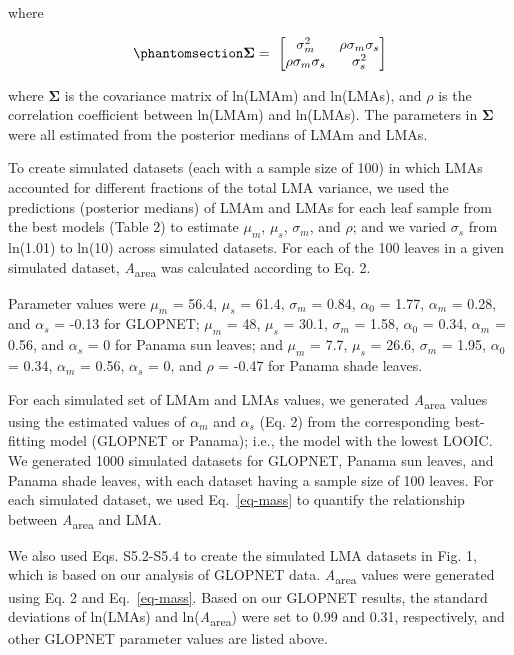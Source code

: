 \documentclass[
  12pt,
  letterpaper,
  DIV=11,
  numbers=noendperiod]{scrartcl}
\numberwithin{equation}{section}
\begin{document}
where

\begin{equation}\phantomsection\label{eq-Sigma}{
\boldsymbol{\Sigma} = \
\begin{bmatrix}
\sigma_m^2 & \rho \sigma_m \sigma_s \\
\rho \sigma_m \sigma_s & \sigma_s^2 \\
\end{bmatrix}
}\end{equation}

where \(\boldsymbol{\Sigma}\) is the covariance matrix of ln(LMAm) and
ln(LMAs), and \(\rho\) is the correlation coefficient between ln(LMAm)
and ln(LMAs). The parameters in \(\boldsymbol{\Sigma}\) were all
estimated from the posterior medians of LMAm and LMAs.

To create simulated datasets (each with a sample size of 100) in which
LMAs accounted for different fractions of the total LMA variance, we
used the predictions (posterior medians) of LMAm and LMAs for each leaf
sample from the best models (Table 2) to estimate \(\mu_m\), \(\mu_s\),
\(\sigma_m\), and \(\rho\); and we varied \(\sigma_s\) from ln(1.01) to
ln(10) across simulated datasets. For each of the 100 leaves in a given
simulated dataset, \emph{A}\textsubscript{area} was calculated according
to Eq. 2.

Parameter values were \(\mu_m\) = 56.4, \(\mu_s\) = 61.4, \(\sigma_m\) =
0.84, \(\alpha_0\) = 1.77, \(\alpha_m\) = 0.28, and \(\alpha_s\) = -0.13
for GLOPNET; \(\mu_m\) = 48, \(\mu_s\) = 30.1, \(\sigma_m\) = 1.58,
\(\alpha_0\) = 0.34, \(\alpha_m\) = 0.56, and \(\alpha_s\) = 0 for
Panama sun leaves; and \(\mu_m\) = 7.7, \(\mu_s\) = 26.6, \(\sigma_m\) =
1.95, \(\alpha_0\) = 0.34, \(\alpha_m\) = 0.56, \(\alpha_s\) = 0, and
\(\rho\) = -0.47 for Panama shade leaves.

For each simulated set of LMAm and LMAs values, we generated
\emph{A}\textsubscript{area} values using the estimated values of
\(\alpha_m\) and \(\alpha_s\) (Eq. 2) from the corresponding
best-fitting model (GLOPNET or Panama); i.e., the model with the lowest
LOOIC. We generated 1000 simulated datasets for GLOPNET, Panama sun
leaves, and Panama shade leaves, with each dataset having a sample size
of 100 leaves. For each simulated dataset, we used Eq.~\ref{eq-mass} to
quantify the relationship between \emph{A}\textsubscript{area} and LMA.

We also used Eqs. S5.2-S5.4 to create the simulated LMA datasets in Fig.
1, which is based on our analysis of GLOPNET data.
\emph{A}\textsubscript{area} values were generated using Eq. 2 and
Eq.~\ref{eq-mass}. Based on our GLOPNET results, the standard deviations
of ln(LMAs) and ln(\emph{A}\textsubscript{area}) were set to 0.99 and
0.31, respectively, and other GLOPNET parameter values are listed above.
\end{document}

